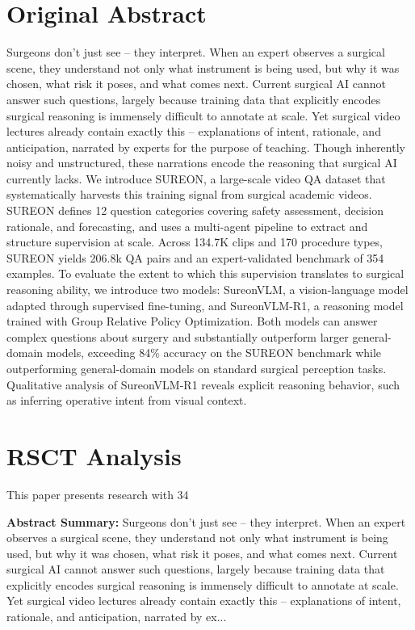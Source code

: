 \documentclass[11pt,a4paper]{article}
\begin{document}
\section{Original Abstract}
Surgeons don't just see -- they interpret. When an expert observes a surgical scene, they understand not only what instrument is being used, but why it was chosen, what risk it poses, and what comes next. Current surgical AI cannot answer such questions, largely because training data that explicitly encodes surgical reasoning is immensely difficult to annotate at scale. Yet surgical video lectures already contain exactly this -- explanations of intent, rationale, and anticipation, narrated by experts for the purpose of teaching. Though inherently noisy and unstructured, these narrations encode the reasoning that surgical AI currently lacks. We introduce SUREON, a large-scale video QA dataset that systematically harvests this training signal from surgical academic videos. SUREON defines 12 question categories covering safety assessment, decision rationale, and forecasting, and uses a multi-agent pipeline to extract and structure supervision at scale. Across 134.7K clips and 170 procedure types, SUREON yields 206.8k QA pairs and an expert-validated benchmark of 354 examples. To evaluate the extent to which this supervision translates to surgical reasoning ability, we introduce two models: SureonVLM, a vision-language model adapted through supervised fine-tuning, and SureonVLM-R1, a reasoning model trained with Group Relative Policy Optimization. Both models can answer complex questions about surgery and substantially outperform larger general-domain models, exceeding 84\% accuracy on the SUREON benchmark while outperforming general-domain models on standard surgical perception tasks. Qualitative analysis of SureonVLM-R1 reveals explicit reasoning behavior, such as inferring operative intent from visual context.

\section{RSCT Analysis}
This paper presents research with 34%

\textbf{Abstract Summary:} Surgeons don't just see -- they interpret. When an expert observes a surgical scene, they understand not only what instrument is being used, but why it was chosen, what risk it poses, and what comes next. Current surgical AI cannot answer such questions, largely because training data that explicitly encodes surgical reasoning is immensely difficult to annotate at scale. Yet surgical video lectures already contain exactly this -- explanations of intent, rationale, and anticipation, narrated by ex...
\end{document}
